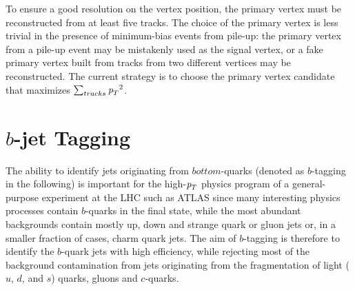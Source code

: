 To ensure a good resolution on the vertex position, the primary vertex
must be reconstructed from at least five tracks. The choice of the primary vertex is less trivial in the presence of minimum-bias events from pile-up:
the primary vertex from a pile-up event may be mistakenly used as the signal vertex, or a fake primary vertex built from tracks from two different vertices may be reconstructed. The current strategy is to choose the primary vertex candidate that maximizes $\sum_{tracks} {\emph{p}_{T}}^2$.

\section{ $b$-jet Tagging}\label{sec:btagging}



The ability to identify jets originating from $bottom$-quarks (denoted as $b$-tagging in the following) is important for the high-${\emph{p}_{T}}$ physics program of a general-purpose experiment at the LHC such as ATLAS since many interesting physics processes contain $b$-quarks in the final state, while the most abundant backgrounds contain mostly up, down and strange quark or gluon jets or, in a smaller fraction of cases, charm quark jets. The aim of $b$-tagging is therefore to identify the $b$-quark jets with high efficiency, while rejecting most of the background contamination from jets originating from the fragmentation of light ($u$, $d$, and $s$) quarks, gluons and $c$-quarks.

